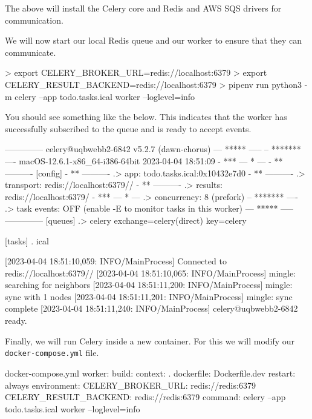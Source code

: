 \documentclass{csse4400}
\begin{document}

The above will install the Celery core and Redis and AWS SQS drivers for communication.

We will now start our local Redis queue and our worker to ensure that they can communicate.


\begin{code}[language=bash,numbers=none]{}
> export CELERY_BROKER_URL=redis://localhost:6379
> export CELERY_RESULT_BACKEND=redis://localhost:6379
> pipenv run python3 -m celery --app todo.tasks.ical worker --loglevel=info
\end{code}

You should see something like the below.
This indicates that the worker has successfully subscribed to the queue and is ready to accept events.

\begin{code}[numbers=none]{}

 -------------- celery@uqbwebb2-6842 v5.2.7 (dawn-chorus)
--- ***** -----
-- ******* ---- macOS-12.6.1-x86_64-i386-64bit 2023-04-04 18:51:09
- *** --- * ---
- ** ---------- [config]
- ** ---------- .> app:         todo.tasks.ical:0x10432e7d0
- ** ---------- .> transport:   redis://localhost:6379//
- ** ---------- .> results:     redis://localhost:6379/
- *** --- * --- .> concurrency: 8 (prefork)
-- ******* ---- .> task events: OFF (enable -E to monitor tasks in this worker)
--- ***** -----
 -------------- [queues]
                .> celery           exchange=celery(direct) key=celery


[tasks]
  . ical

[2023-04-04 18:51:10,059: INFO/MainProcess] Connected to redis://localhost:6379//
[2023-04-04 18:51:10,065: INFO/MainProcess] mingle: searching for neighbors
[2023-04-04 18:51:11,200: INFO/MainProcess] mingle: sync with 1 nodes
[2023-04-04 18:51:11,201: INFO/MainProcess] mingle: sync complete
[2023-04-04 18:51:11,240: INFO/MainProcess] celery@uqbwebb2-6842 ready.
\end{code}

Finally, we will run Celery inside a new container.
For this we will modify our \texttt{docker-compose.yml} file.

\begin{code}[numbers=none]{docker-compose.yml}
worker:
  build:
    context: .
    dockerfile: Dockerfile.dev
  restart: always
  environment:
    CELERY_BROKER_URL: redis://redis:6379
    CELERY_RESULT_BACKEND: redis://redis:6379
  command: celery --app todo.tasks.ical worker --loglevel=info
\end{code}
\end{document}
